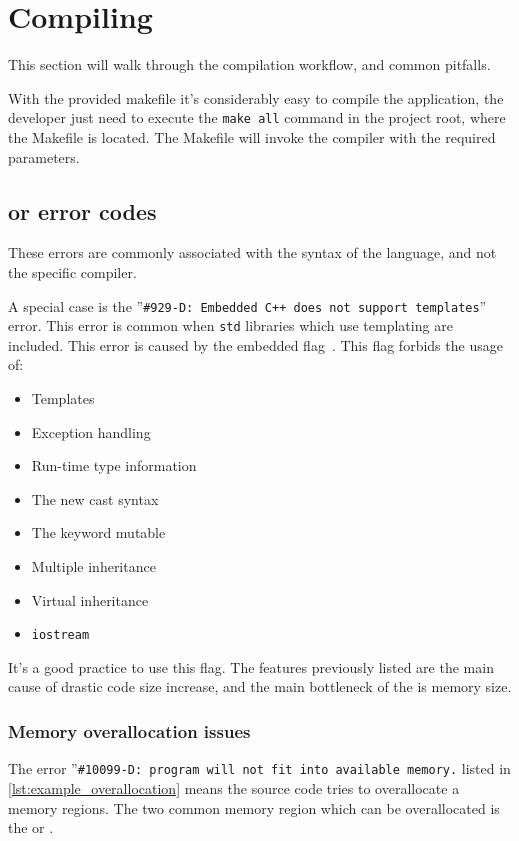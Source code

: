 \section{Compiling}

This section will walk through the compilation workflow, and common pitfalls.

With the provided makefile it's considerably easy to compile the application, the developer just need to execute the \verb|make all| command in the project root, where the Makefile is located. The Makefile will invoke the compiler with the required parameters.

\subsection{\cpl{} or \cpp{} error codes}

These errors are commonly associated with the syntax of the language, and not the specific compiler.

A special case is the ''\verb|#929-D: Embedded C++ does not support templates|'' error. This error is common when \verb+std+ libraries which use templating are included. This error is caused by the embedded \cpp{} flag~\cite[Section 5.13.4]{PRU_C_CPP}. This flag forbids the usage of:
\begin{itemize}
	\item Templates
	\item Exception handling
	\item Run-time type information
	\item The new cast syntax
	\item The keyword mutable
	\item Multiple inheritance
	\item Virtual inheritance
	\item \verb|iostream|
\end{itemize}

It's a good practice to use this flag. The features previously listed are the main cause of drastic code size increase, and the main bottleneck of the \pru{} is memory size.

\subsubsection{Memory overallocation issues}

The error ''\verb|#10099-D: program will not fit into available memory.| listed in \cref{lst:example_overallocation} means the source code tries to overallocate a memory regions. The two common memory region which can be overallocated is the \iram{} or \dram{}.

